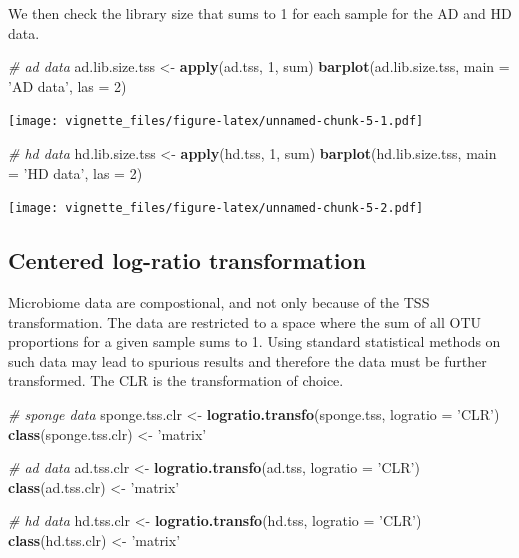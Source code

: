 \documentclass[]{book}
\newenvironment{Shaded}{\begin{snugshade}}{\end{snugshade}}
\newcommand{\KeywordTok}[1]{\textcolor[rgb]{0.13,0.29,0.53}{\textbf{#1}}}
\newcommand{\DataTypeTok}[1]{\textcolor[rgb]{0.13,0.29,0.53}{#1}}
\newcommand{\DecValTok}[1]{\textcolor[rgb]{0.00,0.00,0.81}{#1}}
\newcommand{\StringTok}[1]{\textcolor[rgb]{0.31,0.60,0.02}{#1}}
\newcommand{\CommentTok}[1]{\textcolor[rgb]{0.56,0.35,0.01}{\textit{#1}}}
\newcommand{\NormalTok}[1]{#1}
\begin{document}
We then check the library size that sums to 1 for each sample for the AD
and HD data.

\begin{Shaded}
\begin{Highlighting}[]
\CommentTok{# ad data}
\NormalTok{ad.lib.size.tss <-}\StringTok{ }\KeywordTok{apply}\NormalTok{(ad.tss, }\DecValTok{1}\NormalTok{, sum)}
\KeywordTok{barplot}\NormalTok{(ad.lib.size.tss, }\DataTypeTok{main =}  \StringTok{'AD data'}\NormalTok{, }\DataTypeTok{las =} \DecValTok{2}\NormalTok{)}
\end{Highlighting}
\end{Shaded}

\texttt{[image: vignette\_files/figure-latex/unnamed-chunk-5-1.pdf]}

\begin{Shaded}
\begin{Highlighting}[]
\CommentTok{# hd data}
\NormalTok{hd.lib.size.tss <-}\StringTok{ }\KeywordTok{apply}\NormalTok{(hd.tss, }\DecValTok{1}\NormalTok{, sum)}
\KeywordTok{barplot}\NormalTok{(hd.lib.size.tss, }\DataTypeTok{main =}  \StringTok{'HD data'}\NormalTok{, }\DataTypeTok{las =} \DecValTok{2}\NormalTok{)}
\end{Highlighting}
\end{Shaded}

\texttt{[image: vignette\_files/figure-latex/unnamed-chunk-5-2.pdf]}

\subsection{Centered log-ratio
transformation}\label{centered-log-ratio-transformation}

Microbiome data are compostional, and not only because of the TSS
transformation. The data are restricted to a space where the sum of all
OTU proportions for a given sample sums to 1. Using standard statistical
methods on such data may lead to spurious results and therefore the data
must be further transformed. The CLR is the transformation of choice.

\begin{Shaded}
\begin{Highlighting}[]
\CommentTok{# sponge data}
\NormalTok{sponge.tss.clr <-}\StringTok{ }\KeywordTok{logratio.transfo}\NormalTok{(sponge.tss, }\DataTypeTok{logratio =} \StringTok{'CLR'}\NormalTok{)}
\KeywordTok{class}\NormalTok{(sponge.tss.clr) <-}\StringTok{ 'matrix'} 

\CommentTok{# ad data}
\NormalTok{ad.tss.clr <-}\StringTok{ }\KeywordTok{logratio.transfo}\NormalTok{(ad.tss, }\DataTypeTok{logratio =} \StringTok{'CLR'}\NormalTok{)}
\KeywordTok{class}\NormalTok{(ad.tss.clr) <-}\StringTok{ 'matrix'} 

\CommentTok{# hd data}
\NormalTok{hd.tss.clr <-}\StringTok{ }\KeywordTok{logratio.transfo}\NormalTok{(hd.tss, }\DataTypeTok{logratio =} \StringTok{'CLR'}\NormalTok{)}
\KeywordTok{class}\NormalTok{(hd.tss.clr) <-}\StringTok{ 'matrix'}
\end{Highlighting}
\end{Shaded}
\end{document}
